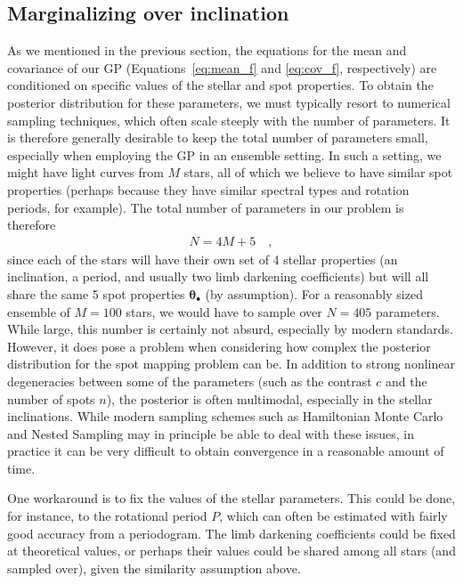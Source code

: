 \documentclass[modern]{aastex62}
\begin{document}
\subsection{Marginalizing over inclination}
\label{sec:inclination}
%
As we mentioned in the previous section,
the equations for the mean and covariance of our GP
(Equations~\ref{eq:mean_f} and \ref{eq:cov_f}, respectively) are conditioned
on specific values of the stellar and spot properties. To obtain the posterior distribution
for these parameters, we must typically resort to numerical sampling techniques,
which often scale steeply with the number of parameters. It is therefore generally
desirable to keep the total number of parameters small, especially when
employing the GP in an ensemble setting.
In such a setting, we might have light curves from $M$ stars, all of which
we believe to have similar spot properties (perhaps because they have
similar spectral types and rotation periods, for example).
The total number of parameters in our problem is therefore
%
\begin{align}
    N = 4 M + 5
    \quad,
\end{align}
%
since each of the stars will have their own set of 4 stellar properties
(an inclination, a period, and usually two limb darkening coefficients)
but will all share the same 5 spot properties
$\pmb{\theta}_\bullet$ (by assumption).
For a reasonably sized ensemble of $M=100$
stars, we would have to sample over $N = 405$ parameters.
While large, this number is certainly not absurd, especially by modern standards.
However, it does pose
a problem when considering how complex the posterior distribution for the
spot mapping problem can be. In addition to strong nonlinear degeneracies
between some of the parameters (such as the contrast $c$ and the
number of spots $n$), the posterior is often multimodal, especially in the
stellar inclinations. While modern sampling schemes such as Hamiltonian
Monte Carlo and Nested Sampling may in principle be able to deal with these
issues, in practice it can be very difficult to obtain convergence in a
reasonable amount of time.

One workaround is to fix the values of the stellar parameters. This could be done,
for instance, to the rotational period $P$, which can often be estimated with
fairly good accuracy from a periodogram. The limb darkening coefficients could
be fixed at theoretical values, or perhaps their values could be shared among
all stars (and sampled over), given the similarity assumption above.
\end{document}
